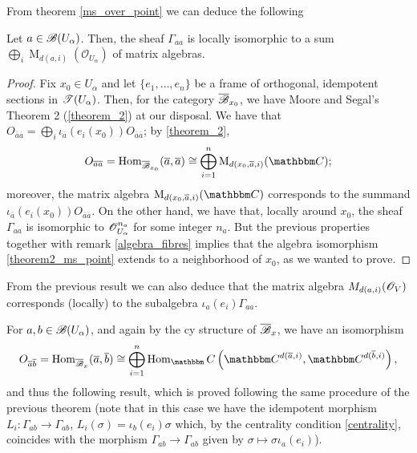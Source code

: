 From theorem \ref{ms_over_point} we can deduce the following

\begin{theorem}\label{theorem2}
Let $a\in \mathscr{B}(U_\alpha )$. Then, the sheaf $\Gamma_{aa}$ is locally isomorphic to a sum $\bigoplus_i\operatorname{M}_{d(a,i)}(\mathscr{O}_{U_\alpha})$ of matrix algebras.
\end{theorem}
\begin{proof}
Fix $x_0\in U_\alpha$ and let $\{e_1,\dots ,e_n\}$ be a frame of orthogonal, idempotent sections in $\mathscr{T}(U_\alpha )$. Then, for the category $\overline{\mathscr{B}}_{x_0}$, we have Moore and Segal's Theorem 2 (\ref{theorem_2}) at our disposal. We have that $O_{\overline{a}\overline{a}}=\bigoplus_i\iota_{\overline{a}}(e_i(x_0))O_{\overline{a}\overline{a}}$; by \ref{theorem_2},
\begin{equation}\label{theorem2_ms_point}
O_{\overline{a}\overline{a}}=\operatorname{Hom}_{\overline{\scr{B}}_{x_0}}(\overline{a},\overline{a})\cong \bigoplus_{i=1}^n\text{M}_{d(x_0,\overline{a},i)}(\comp );
\end{equation}
moreover, the matrix algebra $\opnm{M}_{d(x_0,\overline{a},i)}(\comp )$ corresponds to the summand $\iota_{\overline{a}}(e_i(x_0))O_{\overline{a}\overline{a}}$. On the other hand, we have that, locally around $x_0$, the sheaf $\Gamma_{aa}$ is isomorphic to $\mathscr{O}^{n_a}_{U_\alpha}$ for some integer $n_a$. But the previous properties together with remark \ref{algebra_fibres} implies that the algebra isomorphism \eqref{theorem2_ms_point} extends to a neighborhood of $x_0$, as we wanted to prove.
\end{proof}

\begin{obs}\label{remark_summands}
From the previous result we can also deduce that the matrix algebra $M_{d(a,i)}(\mathscr{O}_V)$ corresponds (locally) to the subalgebra $\iota_a(e_i)\Gamma_{aa}$.
\end{obs}

For $a,b\in \mathscr{B}(U_\alpha )$, and again by the {\sc cy} structure of $\overline{\mathscr{B}}_x$, we have an isomorphism
$$O_{\overline{a}\overline{b}}=\operatorname{Hom}_{\overline{\scr{B}}_x}(\overline{a},\overline{b})\cong \bigoplus_{i=1}^n\operatorname{Hom}_\comp \left (\comp^{d(\overline{a},i)},\comp^{d(\overline{b},i)}\right ),$$
and thus the following result, which is proved following the same procedure of the previous theorem (note that in this case we have the idempotent morphism $L_i:\Gamma_{ab}\to \Gamma_{ab}$, $L_i(\sigma )=\iota_b(e_i)\sigma$ which, by the centrality condition \eqref{centrality}, coincides with the morphism $\Gamma_{ab}\to \Gamma_{ab}$ given by $\sigma \mapsto \sigma \iota_a(e_i)$). 

